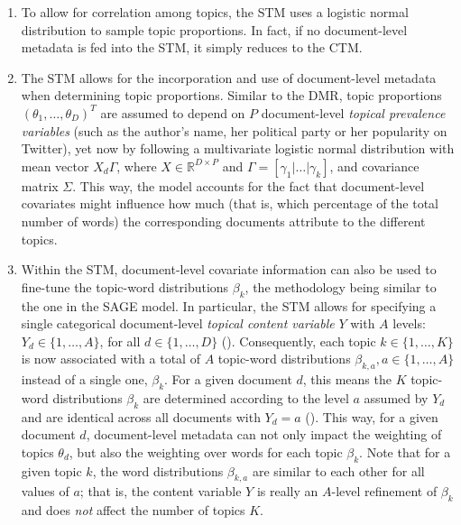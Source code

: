 \begin{enumerate}[label=(\roman*)]
\vspace{-0.25cm}
\item To allow for correlation among topics, the STM uses a logistic normal distribution to sample topic proportions. In fact, if no document-level metadata is fed into the STM, it simply reduces to the CTM.
\vspace{-0.25cm}
\item The STM allows for the incorporation and use of document-level metadata when determining topic proportions. Similar to the DMR, topic proportions $(\theta_1,\dots,\theta_D)^T$ are assumed to depend on $P$ document-level \textit{topical prevalence variables} (such as the author's name, her political party or her popularity on Twitter), yet now by following a multivariate logistic normal distribution with mean vector $X_d\Gamma$, where $X \in \mathbb{R}^{D \times P}$ and $\Gamma = [\gamma_1|\dots|\gamma_k]$, and covariance matrix $\Sigma$. This way, the model accounts for the fact that document-level covariates might influence how much (that is, which percentage of the total number of words) the corresponding documents attribute to the different topics.
\vspace{-0.25cm}
\item Within the STM, document-level covariate information can also be used to fine-tune the topic-word distributions $\beta_k$, the methodology being similar to the one in the SAGE model. In particular, the STM allows for specifying a single categorical document-level \textit{topical content variable} $Y$ with $A$ levels: $Y_d \in \{1,\dots,A\}$, for all $d \in \{1,\dots,D\}$ (\citealp{stm}). Consequently, each topic $k \in \{1,\dots,K\}$ is now associated with a total of $A$ topic-word distributions $\beta_{k,a}, a \in \{1,\dots,A\}$ instead of a single one, $\beta_k$. For a given document $d$, this means the $K$ topic-word distributions $\beta_k$ are determined according to the level $a$ assumed by $Y_d$ and are identical across all documents with $Y_d = a$ (\citealp{roberts2016model}). This way, for a given document $d$, document-level metadata can not only impact the weighting of topics $\theta_d$, but also the weighting over words for each topic $\beta_k$. Note that for a given topic $k$, the word distributions $\beta_{k,a}$ are similar to each other for all values of $a$; that is, the content variable $Y$ is really an $A$-level refinement of $\beta_k$ and does \textit{not} affect the number of topics $K$.

\end{enumerate}

